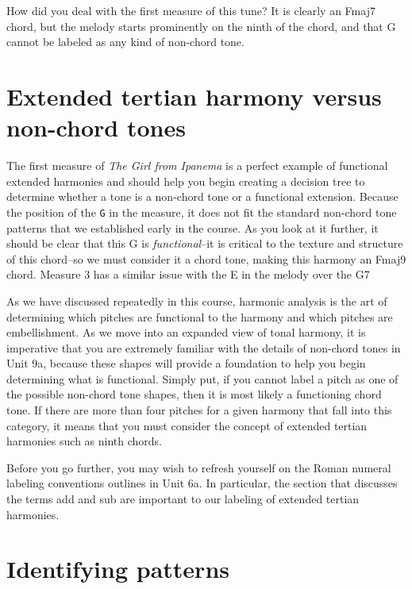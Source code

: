 \documentclass{book}
\begin{document}
How did you deal with the first measure of this tune? It is clearly an Fmaj7
chord, but the melody starts prominently on the ninth of the chord, and that G
cannot be labeled as any kind of non-chord tone.

\hypertarget{extended-tertian-harmony-versus-non-chord-tones}{%
\section{Extended tertian harmony versus non-chord
tones}\label{extended-tertian-harmony-versus-non-chord-tones}}

The first measure of \emph{The Girl from Ipanema} is a perfect example of
functional extended harmonies and should help you begin creating a decision
tree to determine whether a tone is a non-chord tone or a functional
extension. Because the position of the \texttt{G} in the measure, it does not
fit the standard non-chord tone patterns that we established early in the
course. As you look at it further, it should be clear that this G is
\emph{functional}--it is critical to the texture and structure of this
chord--so we must consider it a chord tone, making this harmony an Fmaj9
chord. Measure 3 has a similar issue with the E in the melody over the G7

As we have discussed repeatedly in this course, harmonic analysis is the art
of determining which pitches are functional to the harmony and which pitches
are embellishment. As we move into an expanded view of tonal harmony, it is
imperative that you are extremely familiar with the details of non-chord tones
in Unit 9a, because these shapes will provide a foundation to help you begin
determining what is functional. Simply put, if you cannot label a pitch as one
of the possible non-chord tone shapes, then it is most likely a functioning
chord tone. If there are more than four pitches for a given harmony that fall
into this category, it means that you must consider the concept of extended
tertian harmonies such as ninth chords.

Before you go further, you may wish to refresh yourself on the Roman numeral
labeling conventions outlines in Unit 6a. In particular, the section that
discusses the terms add and sub are important to our labeling of extended
tertian harmonies.

\hypertarget{identifying-patterns}{%
\section{Identifying patterns}\label{identifying-patterns}}
\end{document}
